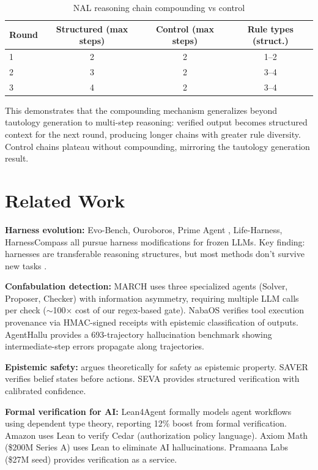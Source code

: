 \documentclass{article}
\begin{document}
\begin{table}[h]
\centering
\caption{NAL reasoning chain compounding vs control}
\label{tab:compounding}
\begin{tabular}{lccc}
\toprule
Round & Structured (max steps) & Control (max steps) & Rule types (struct.) \\
\midrule
1 & 2 & 2 & 1--2 \\
2 & 3 & 2 & 3--4 \\
3 & 4 & 2 & 3--4 \\
\bottomrule
\end{tabular}
\end{table}

This demonstrates that the compounding mechanism generalizes beyond tautology generation to multi-step reasoning: verified output becomes structured context for the next round, producing longer chains with greater rule diversity. Control chains plateau without compounding, mirroring the tautology generation result.

\section{Related Work}
\label{sec:related}

\textbf{Harness evolution:} Evo-Bench, Ouroboros, Prime Agent \citep{primeagent}, Life-Harness, HarnessCompass all pursue harness modifications for frozen LLMs. Key finding: harnesses are transferable reasoning structures, but most methods don't survive new tasks \citep{sisurvey}.

\textbf{Confabulation detection:} MARCH \citep{march} uses three specialized agents (Solver, Proposer, Checker) with information asymmetry, requiring multiple LLM calls per check ($\sim$100$\times$ cost of our regex-based gate). NabaOS \citep{nabaos} verifies tool execution provenance via HMAC-signed receipts with epistemic classification of outputs. AgentHallu \citep{agenthallu} provides a 693-trajectory hallucination benchmark showing intermediate-step errors propagate along trajectories.

\textbf{Epistemic safety:} \citep{agenticsafety} argues theoretically for safety as epistemic property. SAVER \citep{saver} verifies belief states before actions. SEVA provides structured verification with calibrated confidence.

\textbf{Formal verification for AI:} Lean4Agent \citep{lean4agent} formally models agent workflows using dependent type theory, reporting 12\% boost from formal verification. Amazon uses Lean to verify Cedar (authorization policy language). Axiom Math (\$200M Series A) uses Lean to eliminate AI hallucinations. Pramaana Labs (\$27M seed) provides verification as a service.
\end{document}
